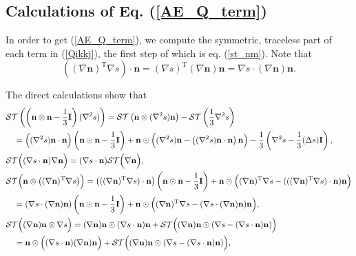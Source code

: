 \documentclass[10pt, a4paper]{article}
\newcommand\n{\mathbf{n}}
\begin{document}
\begin{appendices}

\section{Calculations of Eq. (\ref{AE_Q_term})}
In order to get (\ref{AE_Q_term}), we compute the symmetric, traceless part of each term in (\ref{Qikkj}), the first step of which is eq. (\ref{st_nm}). Note that
\begin{equation}
 ( (\nabla \n)^{\mathrm{T}} \nabla s ) \cdot \n =  (\nabla s)^{\mathrm{T}} (\nabla \n) \n = \nabla s \cdot (\nabla \n) \n.
\end{equation}

The direct calculations show that
\begin{equation}
\begin{aligned}
  & \mathcal{ST} \left( \left( \n \otimes \n - \frac{1}{3} \mathbf{I} \right) (\nabla^2 s) \right) = \mathcal{ST} \left( \n \otimes (\nabla^2 s)\n \right) - \mathcal{ST} \left( \dfrac{1}{3} \nabla^2 s \right)\\ 
  & \quad =  \Bigl(  (\nabla^2 s) \n \cdot \n \Bigr)  \left( \n \odot \n - \frac{1}{3} \mathbf{I} \right)  + \n \odot \Bigl(  (\nabla^2 s) \n - \left( (\nabla^2 s) \n \cdot \n \right) \n \Bigr) - \frac{1}{3} \left( \nabla^2 s - \frac{1}{3} (\Delta s) \mathbf{I} \right), \\
& \mathcal{ST} \Bigl( (\nabla s \cdot \n) \nabla \n \Bigr) = (\nabla s \cdot \n) \mathcal{ST} \Bigl( \nabla \n \Bigr), \\
& \mathcal{ST} \Bigl( \n \otimes \left( (\nabla \n)^{\mathrm{T}} \nabla s  \right) \Bigr) =  \left( ( (\nabla \n)^{\mathrm{T}} \nabla s ) \cdot \n \right) \left( \n \odot \n - \frac{1}{3} \mathbf{I} \right) + \n \odot \Bigl( (\nabla \n)^{\mathrm{T}} \nabla s - (  ( (\nabla \n)^{\mathrm{T}} \nabla s ) \cdot \n) \n \Bigr) \\
& \quad  = \left( \nabla s \cdot (\nabla \n) \n \right) \left( \n \odot \n - \frac{1}{3} \mathbf{I} \right) + \n \odot \Bigl( (\nabla \n)^{\mathrm{T}} \nabla s - (\nabla s \cdot (\nabla \n) \n) \n \Bigr), \\
& \mathcal{ST} \Bigl( (\nabla \n) \n \otimes \nabla s \Bigr) = (\nabla \n) \n \odot (\nabla s \cdot \n) \n  + \mathcal{ST} \Bigl( (\nabla \n) \n \odot ( \nabla s - (\nabla s \cdot \n) \n ) \Bigr) \\
   & \quad = \n \odot \Bigl( (\nabla s \cdot \n) (\nabla \n) \n \Bigr)  + \mathcal{ST} \Bigl( (\nabla \n) \n \odot ( \nabla s - (\nabla s \cdot \n) \n ) \Bigr), \\

\end{aligned}
\end{equation}
\end{appendices}
\end{document}
